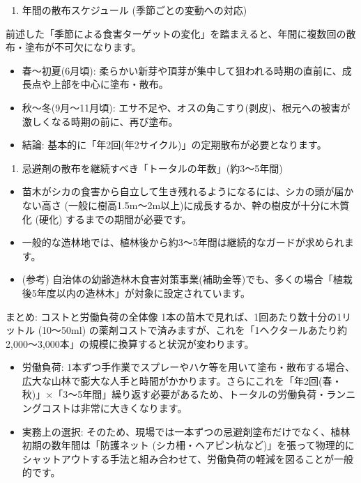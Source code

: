 \documentclass[a4paper, 11pt]{jsarticle}
\begin{document}
\begin{enumerate}
    \item[②] 年間の散布スケジュール (季節ごとの変動への対応)
\end{enumerate}
前述した「季節による食害ターゲットの変化」を踏まえると、年間に複数回の散布・塗布が不可欠になります。
\begin{itemize}
    \item 春〜初夏(6月頃): 柔らかい新芽や頂芽が集中して狙われる時期の直前に、成長点や上部を中心に塗布・散布。
    \item 秋〜冬(9月〜11月頃): エサ不足や、オスの角こすり(剥皮)、根元への被害が激しくなる時期の前に、再び塗布。
    \item 結論: 基本的に「年2回(年2サイクル)」の定期散布が必要となります。
\end{itemize}
\begin{enumerate}
    \item[③] 忌避剤の散布を継続すべき「トータルの年数」(約3〜5年間)
\end{enumerate}
\begin{itemize}
    \item 苗木がシカの食害から自立して生き残れるようになるには、シカの頭が届かない高さ (一般に樹高1.5m〜2m以上)に成長するか、幹の樹皮が十分に木質化 (硬化) するまでの期間が必要です。
    \item 一般的な造林地では、植林後から約3〜5年間は継続的なガードが求められます\cite{ref8}。
    \item (参考) 自治体の幼齢造林木食害対策事業(補助金等)でも、多くの場合「植栽後5年度以内の造林木」が対象に設定されています\cite{ref8}。
\end{itemize}
まとめ: コストと労働負荷の全体像
1本の苗木で見れば、1回あたり数十分の1リットル (10〜50ml) の薬剤コストで済みますが、これを「1ヘクタールあたり約2,000〜3,000本」の規模に換算すると状況が変わります。
\begin{itemize}
    \item 労働負荷: 1本ずつ手作業でスプレーやハケ等を用いて塗布・散布する場合、広大な山林で膨大な人手と時間がかかります。さらにこれを「年2回(春・秋)」×「3〜5年間」繰り返す必要があるため、トータルの労働負荷・ランニングコストは非常に大きくなります。
    \item 実務上の選択: そのため、現場では一本ずつの忌避剤塗布だけでなく、植林初期の数年間は「防護ネット (シカ柵・ヘアピン杭など)」を張って物理的にシャットアウトする手法と組み合わせて、労働負荷の軽減を図ることが一般的です。
\end{itemize}
\end{document}
